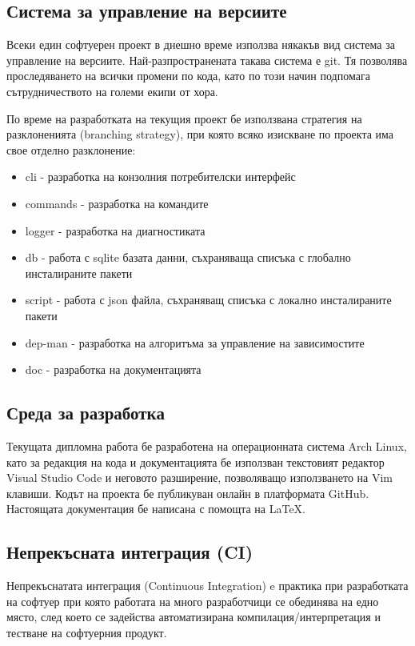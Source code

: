 \subsection{Система за управление на версиите}

Всеки един софтуерен проект в днешно време използва някакъв вид система за
управление на версиите. Най-разпространената такава система е git. Тя позволява
проследяването на всички промени по кода, като по този начин подпомага
сътрудничеството на големи екипи от хора.

По време на разработката на текущия проект бе използвана стратегия на
разклоненията (branching strategy), при която всяко изискване по проекта има
свое отделно разклонение:

\begin{itemize}
    \item cli - разработка на конзолния потребителски интерфейс
    \item commands - разработка на командите
    \item logger - разработка на диагностиката
    \item db - работа с sqlite базата данни, съхраняваща списъка с глобално
          инсталираните пакети
    \item script - работа с \acrshort{json} файла, съхраняващ списъка с локално
          инсталираните пакети
    \item dep-man - разработка на алгоритъма за управление на зависимостите
    \item doc - разработка на документацията
\end{itemize}


\subsection{Среда за разработка}

Текущата дипломна работа бе разработена на операционната система Arch Linux,
като за редакция на кода и документацията бе използван текстовият редактор
Visual Studio Code и неговото разширение, позволяващо използването на Vim
клавиши. Кодът на проекта бе публикуван онлайн в платформата GitHub. Настоящата
документация бе написана с помощта на \LaTeX.


\subsection{Непрекъсната интеграция (CI)}

Непрекъснатата интеграция (Continuous Integration)  e практика
при разработката на софтуер при която работата на много разработчици се
обединява на едно място, след което се задейства автоматизирана
компилация/интерпретация и тестване на софтуерния продукт.

